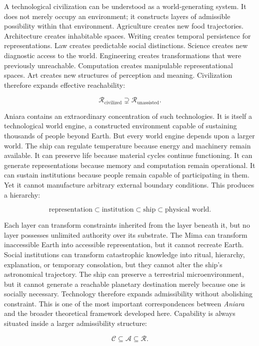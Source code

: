 \documentclass[11pt,oneside]{book}
\theoremstyle{definition}
\theoremstyle{remark}
\begin{document}
A technological civilization can be understood as a world-generating system. It does not merely
occupy an environment; it constructs layers of admissible possibility within that environment.
Agriculture creates new food trajectories. Architecture creates inhabitable spaces. Writing creates
temporal persistence for representations. Law creates predictable social distinctions. Science
creates new diagnostic access to the world. Engineering creates transformations that were previously
unreachable. Computation creates manipulable representational spaces. Art creates new structures of
perception and meaning. Civilization therefore expands effective reachability:

\[
\mathcal{R}_{\mathrm{civilized}} \supsetneq \mathcal{R}_{\mathrm{unassisted}}.
\]

Aniara contains an extraordinary concentration of such technologies. It is itself a technological
world engine, a constructed environment capable of sustaining thousands of people beyond Earth. But
every world engine depends upon a larger world. The ship can regulate temperature because energy and
machinery remain available. It can preserve life because material cycles continue functioning. It
can generate representations because memory and computation remain operational. It can sustain
institutions because people remain capable of participating in them. Yet it cannot manufacture
arbitrary external boundary conditions. This produces a hierarchy:

\[
\text{representation} \subset \text{institution} \subset \text{ship} \subset \text{physical world}.
\]

Each layer can transform constraints inherited from the layer beneath it, but no layer possesses
unlimited authority over its substrate. The Mima can transform inaccessible Earth into accessible
representation, but it cannot recreate Earth. Social institutions can transform catastrophic
knowledge into ritual, hierarchy, explanation, or temporary consolation, but they cannot alter the
ship's astronomical trajectory. The ship can preserve a terrestrial microenvironment, but it cannot
generate a reachable planetary destination merely because one is socially necessary. Technology
therefore expands admissibility without abolishing constraint. This is one of the most important
correspondences between \emph{Aniara} and the broader theoretical framework developed here.
Capability is always situated inside a larger admissibility structure:

\[
\mathcal{C}\subseteq\mathcal{A}\subseteq\mathcal{R}.
\]
\end{document}
